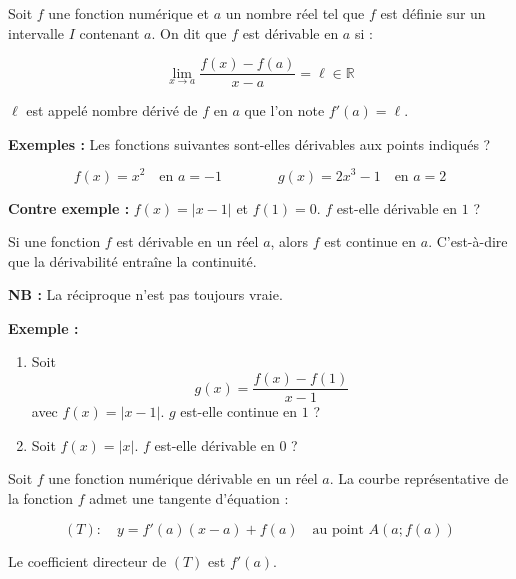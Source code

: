 \documentclass[12pt,a4paper]{article}
\newcounter{exemple}
\begin{document}
\begin{tcolorbox}[
    colback=green!5,
    colframe=green!60!black,
    colbacktitle=green!60!black,
    title=1. Définition du nombre dérivé,
    fonttitle=\bfseries,
    boxrule=0.8pt
]

Soit $f$ une fonction numérique et $a$ un nombre réel tel que $f$
est définie sur un intervalle $I$ contenant $a$. On dit que $f$
est dérivable en $a$ si :

\[
\lim_{x\to a}\frac{f(x)-f(a)}{x-a}=\ell\in\mathbb{R}
\]

$\ell$ est appelé nombre dérivé de $f$ en $a$ que l'on note
$f'(a)=\ell$.

\end{tcolorbox}

\textbf{Exemples :} Les fonctions suivantes sont-elles dérivables
aux points indiqués ?

\[
f(x)=x^2 \quad \text{en } a=-1
\qquad\qquad
g(x)=2x^3-1 \quad \text{en } a=2
\]

\textbf{Contre exemple :} $f(x)=|x-1|$ et $f(1)=0$.
$f$ est-elle dérivable en $1$ ?

\begin{tcolorbox}[
    colback=green!5,
    colframe=green!60!black,
    colbacktitle=green!60!black,
    title=\textbf{2. Théorème},
    fonttitle=\bfseries,
    boxrule=0.8pt
]

Si une fonction $f$ est dérivable en un réel $a$, alors $f$ est
continue en $a$. C'est-à-dire que la dérivabilité entraîne
la continuité.

\textbf{NB :} La réciproque n'est pas toujours vraie.

\end{tcolorbox}

\textbf{Exemple :}

\begin{enumerate}

    \item Soit
    \[
    g(x)=\frac{f(x)-f(1)}{x-1}
    \]
    avec $f(x)=|x-1|$. $g$ est-elle continue en $1$ ?

    \item Soit $f(x)=|x|$. $f$ est-elle dérivable en $0$ ?

\end{enumerate}


\begin{tcolorbox}[
    colback=green!5,
    colframe=green!60!black,
    colbacktitle=green!60!black,
    title=\textbf{3. Interprétation graphique},
    fonttitle=\bfseries,
    boxrule=0.8pt
]

Soit $f$ une fonction numérique dérivable en un réel $a$.
La courbe représentative de la fonction $f$ admet une tangente
d'équation :

\[
(T):\quad y=f'(a)(x-a)+f(a)
\quad \text{au point } A(a;f(a))
\]

Le coefficient directeur de $(T)$ est $f'(a)$.

\end{tcolorbox}
\end{document}

